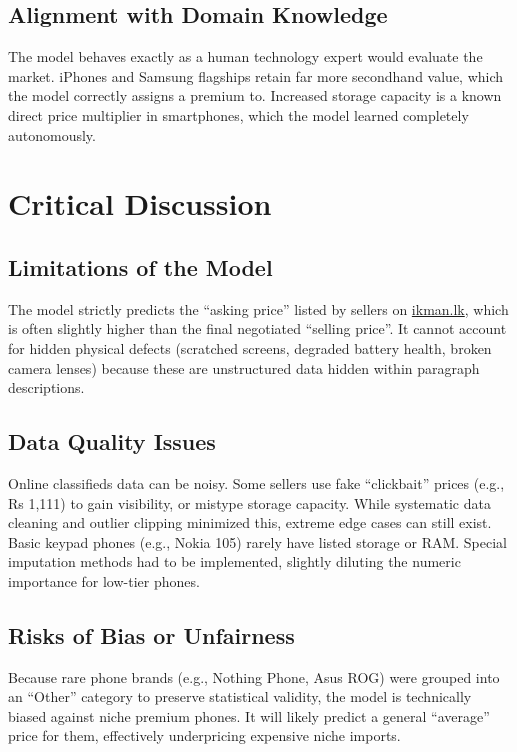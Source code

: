 \documentclass[12pt,a4paper]{article}
\begin{document}
\subsection{Alignment with Domain Knowledge}
The model behaves exactly as a human technology expert would evaluate the market. iPhones and Samsung flagships retain far more secondhand value, which the model correctly assigns a premium to. Increased storage capacity is a known direct price multiplier in smartphones, which the model learned completely autonomously.


\section{Critical Discussion}

\subsection{Limitations of the Model}
The model strictly predicts the ``asking price'' listed by sellers on \href{https://ikman.lk}{ikman.lk}, which is often slightly higher than the final negotiated ``selling price''. It cannot account for hidden physical defects (scratched screens, degraded battery health, broken camera lenses) because these are unstructured data hidden within paragraph descriptions. 

\subsection{Data Quality Issues}
Online classifieds data can be noisy. Some sellers use fake ``clickbait'' prices (e.g., Rs 1,111) to gain visibility, or mistype storage capacity. While systematic data cleaning and outlier clipping minimized this, extreme edge cases can still exist. Basic keypad phones (e.g., Nokia 105) rarely have listed storage or RAM. Special imputation methods had to be implemented, slightly diluting the numeric importance for low-tier phones. 

\subsection{Risks of Bias or Unfairness}
Because rare phone brands (e.g., Nothing Phone, Asus ROG) were grouped into an ``Other'' category to preserve statistical validity, the model is technically biased against niche premium phones. It will likely predict a general ``average'' price for them, effectively underpricing expensive niche imports. 
\end{document}
